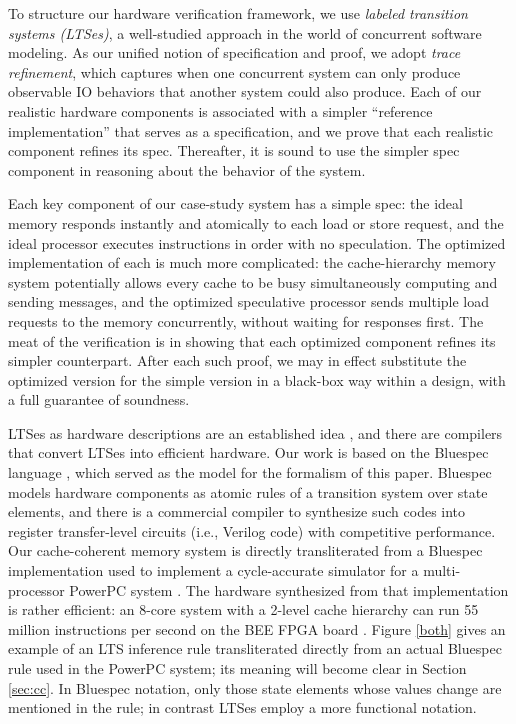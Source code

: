 To structure our hardware verification framework, we use \emph{labeled
transition systems (LTSes)}, a well-studied approach in the world of
concurrent software modeling.  As our unified notion of specification and
proof, we adopt \emph{trace refinement}, which captures when one concurrent
system can only produce observable IO behaviors that another system could also
produce.  Each of our realistic hardware components is associated with a
simpler ``reference implementation'' that serves as a specification, and we
prove that each realistic component refines its spec.  Thereafter, it is sound
to use the simpler spec component in reasoning about the behavior of the
system.

Each key component of our case-study system has a simple spec: the ideal memory
responds instantly and atomically to each load or store request, and the ideal
processor executes instructions in order with no speculation.  The optimized
implementation of each is much more complicated: the cache-hierarchy memory
system potentially allows every cache to be busy simultaneously computing and
sending messages, and the optimized speculative processor sends multiple load
requests to the memory concurrently, without waiting for responses first.  The meat
of the verification is in showing that each optimized component refines its
simpler counterpart.  After each such proof, we may in effect substitute the
optimized version for the simple version in a black-box way within a design,
with a full guarantee of soundness.

LTSes as hardware descriptions are an established
idea \cite{HoeArvind:TRSSynthesis1, Hoe:TCAD}, and there are compilers that
convert LTSes into efficient hardware.  Our work is based on the Bluespec
language \cite{BSV:LangRef, Bluespec:TFRG}, which served as the model for the
formalism of this paper.  Bluespec models hardware components as atomic rules
of a transition system over state elements, and there is a commercial compiler
to synthesize such codes into register transfer-level circuits (i.e., Verilog code) with
competitive performance.  Our cache-coherent memory system is directly
transliterated from a Bluespec
implementation \cite{DNA:CoherenceImplementation} used to implement a
cycle-accurate simulator for a multi-processor PowerPC system \cite{Khan:PowerPc}. The hardware synthesized
from that implementation is rather efficient: an 8-core system with a 2-level
cache hierarchy can run 55 million instructions per second on the BEE FPGA
board \cite{bee2}. Figure \ref{both} gives an example of an LTS inference rule
transliterated directly from an actual Bluespec rule used in the PowerPC
system; its meaning will become clear in Section \ref{sec:cc}. In Bluespec
notation, only those state elements whose values change are mentioned in the
rule; in contrast LTSes employ a more functional notation.

